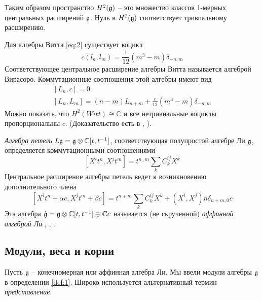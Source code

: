 Таким образом пространство $H^{2}(\mathfrak{g})$ -- это множество классов 1-мерных центральных расширений $\mathfrak{g}$. Нуль в $H^{2}(\mathfrak{g})$  соответствует тривиальному расширению. 

Для алгебры Витта \eqref{eq:2} существует коцикл
\begin{equation}
  \label{eq:105}
  c(l_{n},l_{m})=\frac{1}{12}(m^{3}-m)\delta_{-n,m}
\end{equation}
Соответствующее центральное расширение алгебры Витта называется алгеброй Вирасоро. Коммутационные соотношения этой алгебры имеют вид
\begin{eqnarray}
  \label{eq:106}
  [L_{n},c]=0\\
  \left[L_{n},L_{m}\right]=(n-m)L_{n+m} +\frac{c}{12} (m^{3}-m) \delta_{-n,m}
\end{eqnarray}
Можно показать, что $H^{2}(Witt)\cong \mathbb{C}$ и все нетривиальные коциклы пропорциональны $c$. 
(Доказательство есть в \cite{fuks1986cohomology}, \cite{schottenloher2008mathematical}).

{\it Алгебра петель} $L\mathfrak{g}=\mathfrak{g}\otimes \mathbb{C}[t,t^{-1}]$, соответствующая полупростой алгебре Ли $\mathfrak{g}$, определяется коммутационными соотношениями
\begin{equation}
  \label{eq:108}
  [X^{i}t^{n},X^{j}t^{m}]=t^{n_+m}\sum_{k}C^{ij}_{k}X^{k}
\end{equation}
Центральное расширение алгебры петель ведет к возникновению дополнительного члена
\begin{equation}
  \label{eq:112}
   [X^{i}t^{n}+\alpha c,X^{j}t^{m}+\beta c]=t^{n+m}\sum_{k}C^{ij}_{k}X^{k}+(X^{i},X^{j})n\delta_{n+m,0}c
\end{equation}
Эта алгебра $\hat{\mathfrak{g}}=\mathfrak{g}\otimes\mathbb{C}[t,t^{-1}]\oplus\mathbb{C}c$ называется (не скрученной)  {\it аффинной алгеброй Ли} \cite{kac1990idl}, \cite{wakimoto2001idl,wakimoto2001lectures}, \cite{kass1990ala}.

\subsection{Модули, веса и корни}
\label{sec:weights-roots}

Пусть $\mathfrak{g}$ -- конечномерная или аффинная алгебра Ли. Мы ввели модули алгебры $\mathfrak{g}$ в определении \ref{def:1}. Широко используется альтернативный термин {\it представление}.


